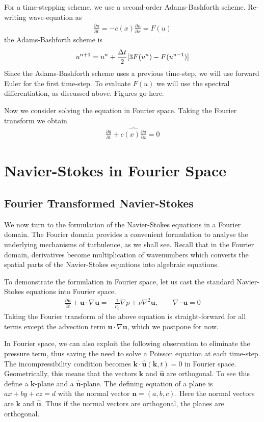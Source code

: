 For a time-stepping scheme, we use a second-order Adams-Bashforth\cite{durran} scheme. Re-writing wave-equation as
\begin{align}
\frac{\partial u}{\partial t} = -c(x)\frac{\partial u}{\partial x} = F(u)
\end{align}
the Adams-Bashforth scheme is
\begin{align}
u^{n+1} = u^{n} + \frac{\Delta t}{2}[3F(u^{n})-F(u^{n-1})]
\end{align}
Since the Adams-Bashforth scheme uses a previous time-step, we will use forward Euler for the first time-step. To evaluate $F(u)$ we will use the spectral differentiation, as discussed above. 
Figures go here.

Now we consider solving the equation in Fourier space. Taking the Fourier transform we obtain
\begin{align}
\frac{\partial \hat{u}}{\partial t} + \widehat{c(x)\frac{\partial u}{\partial x}}=0
\end{align}

\section{Navier-Stokes in Fourier Space}
\subsection{Fourier Transformed Navier-Stokes}
We now turn to the formulation of the Navier-Stokes equations in a Fourier domain. The Fourier domain provides a convenient formulation to analyse the underlying mechanisms of turbulence, as we shall see. Recall that in the Fourier domain, derivatives become multiplication of wavenumbers which converts the spatial parts of the Navier-Stokes equations into algebraic equations. 

To demonstrate the formulation in Fourier space, let us cast the standard Navier-Stokes equations into Fourier space. 
\begin{align}
\frac{\partial \textbf{u}}{\partial t} + \textbf{u}\cdot\nabla\textbf{u} = -\frac{1}{\rho_{0}}\nabla p + \nu\nabla^{2}\textbf{u}, \qquad \nabla\cdot\textbf{u}=0
\end{align}
Taking the Fourier transform of the above equation is straight-forward for all terms except the advection term $\textbf{u}\cdot\nabla\textbf{u}$, which we postpone for now.

In Fourier space, we can also exploit the following observation to eliminate the pressure term, thus saving the need to solve a Poisson equation at each time-step. The incompressibility condition becomes $\textbf{k}\cdot\hat{\textbf{u}}(\textbf{k},t)=0$ in Fourier space. Geometrically, this means that the vectors $\textbf{k}$ and $\hat{\textbf{u}}$ are orthogonal. To see this define a $\textbf{k}$-plane and a $\hat{\textbf{u}}$-plane. The defining equation of a plane is $ax+by+cz=d$ with the normal vector $\textbf{n}=(a,b,c)$. Here the normal vectors are $\textbf{k}$ and $\hat{\textbf{u}}$. Thus if the normal vectors are orthogonal, the planes are orthogonal.

